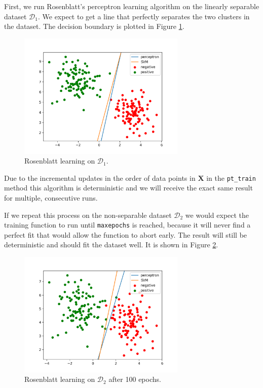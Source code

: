 \documentclass{support/acm_proc_article-sp}
\begin{document}
    First, we run Rosenblatt's perceptron learning algorithm on the linearly separable dataset $\mathcal{D}_1$.
    We expect to get a line that perfectly separates the two clusters in the dataset.
    The decision boundary is plotted in Figure \ref{fig:rosenblatt-classification}.
    \begin{figure}[!htbp]
        \centering
        \includegraphics[width=8cm]{images/rosenblatt-classification.png}
        \caption{Rosenblatt learning on $\mathcal{D}_1$.}
        \label{fig:rosenblatt-classification}
    \end{figure}
    Due to the incremental updates in the order of data points in $\mathbf{X}$ in the \lstinline{pt_train} method this
    algorithm is deterministic and we will receive the exact same result for multiple, consecutive runs.

    If we repeat this process on the non-separable dataset $\mathcal{D}_2$ we would expect the training function to
    run until \lstinline{maxepochs} is reached, because it will never find a perfect fit that would allow the function to abort
    early.
    The result will still be deterministic and should fit the dataset well.
    It is shown in Figure \ref{fig:rosenblatt-classification-d2}.
    \begin{figure}[!htbp]
        \centering
        \includegraphics[width=8cm]{images/rosenblatt-classification-d2.png}
        \caption{Rosenblatt learning on $\mathcal{D}_2$ after 100 epochs.}
        \label{fig:rosenblatt-classification-d2}
    \end{figure}
\end{document}
